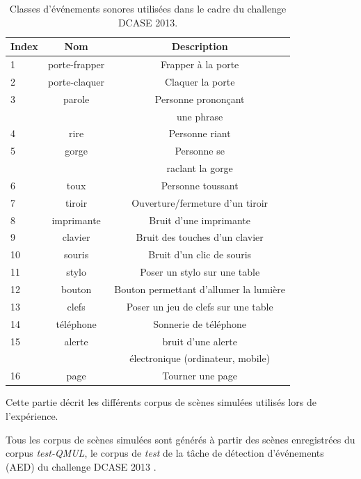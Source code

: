 \begin{table}[t]
\begin{center}
\begin{tabular}{lcc}
\textbf{Index} & \textbf{Nom}  & \textbf{Description}  \\ 
\hline
1   & porte-frapper & Frapper à la porte \\
2   & porte-claquer & Claquer la porte \\
3   & parole        & Personne prononçant \\
    &               &  une phrase \\
4   & rire          & Personne riant  \\    
5   & gorge         & Personne se   \\
    &               & raclant la gorge \\
6   & toux          & Personne toussant \\
7   & tiroir        & Ouverture/fermeture d'un tiroir \\
8   & imprimante    & Bruit d'une imprimante \\
9   & clavier       & Bruit des touches d'un clavier \\
10  & souris        & Bruit d'un clic de souris \\
11  & stylo         & Poser un stylo sur une table \\
12  & bouton        & Bouton permettant d'allumer la lumière \\
13  & clefs         & Poser un jeu de clefs sur une table \\    
14  & téléphone     & Sonnerie de téléphone \\
15  & alerte        & bruit d'une alerte \\
    &               & électronique (ordinateur, mobile) \\
16  & page          & Tourner une page \\     
\hline      
\end{tabular}
\end{center}
\caption{Classes d'événements sonores utilisées dans le cadre du challenge DCASE 2013.}
\label{tab:eventDCASE2013}
\end{table}

Cette partie décrit les différents corpus de scènes simulées utilisés lors de l'expérience. 

Tous les corpus de scènes simulées sont générés à partir des scènes enregistrées du corpus \emph{test-QMUL}, le corpus de \emph{test} de la tâche de détection d'événements (AED) du challenge DCASE 2013  \citep{giannoulis2013detection}. 

